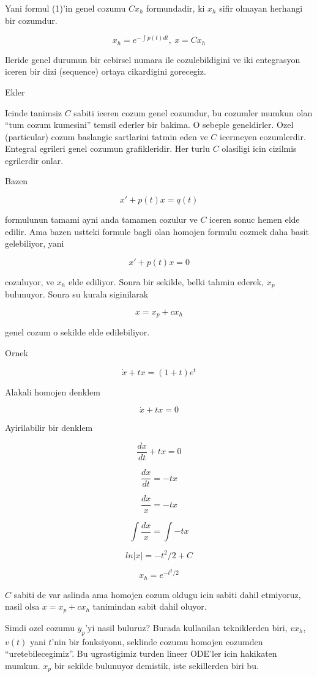 \documentclass[12pt,fleqn]{article}\usepackage{../common}
\begin{document}
Yani formul (1)'in genel cozumu $C x_h$ formundadir, ki $x_h$ sifir
olmayan herhangi bir cozumdur.

\[ x_h = e^{- \int p(t) dt} , \ x = C x_h \]

Ileride genel durumun bir cebirsel numara ile cozulebildigini ve iki
entegrasyon iceren bir dizi (sequence) ortaya cikardigini gorecegiz. 

Ekler

Icinde tanimsiz $C$ sabiti iceren cozum genel cozumdur, bu cozumler mumkun
olan ``tum cozum kumesini'' temsil ederler bir bakima. O sebeple
geneldirler. Ozel (particular) cozum baslangic sartlarini tatmin eden ve
$C$ icermeyen cozumlerdir. Entegral egrileri genel cozumun
grafikleridir. Her turlu $C$ olasiligi icin cizilmis egrilerdir onlar.

Bazen 

\[ x' + p(t)x = q(t) \]
 
formulunun tamami ayni anda tamamen cozulur ve $C$ iceren sonuc hemen elde
edilir. Ama bazen ustteki formule bagli olan homojen formulu cozmek daha
basit gelebiliyor, yani

\[ x' + p(t)x = 0 \]
 
cozuluyor, ve $x_h$ elde ediliyor. Sonra bir sekilde, belki tahmin ederek,
$x_p$ bulunuyor. Sonra su kurala siginilarak 

\[ x = x_p + cx_h \]

genel cozum o sekilde elde edilebiliyor. 

Ornek

\[ \dot{x} + tx = (1+t)e^t \]

Alakali homojen denklem 

\[ \dot{x} + tx = 0\]

Ayirilabilir bir denklem

\[ \frac{dx}{dt} + tx = 0 \]

\[ \frac{dx}{dt} = - tx  \]

\[ \frac{dx}{x} = -tx \]

\[ \int \frac{dx}{x} = \int -tx \]

\[ ln |x| = -t^2 / 2 + C \]

\[ x_h = e^{-t^2/2} \]

$C$ sabiti de var aslinda ama homojen cozum oldugu icin sabiti dahil
etmiyoruz, nasil olsa $x = x_p + cx_h$ tanimindan sabit dahil oluyor.

Simdi ozel cozumu $y_p$'yi nasil buluruz? Burada kullanilan tekniklerden
biri, $vx_h$, $v(t)$ yani $t$'nin bir fonksiyonu, seklinde cozumu homojen
cozumden ``uretebilecegimiz''. Bu ugrastigimiz turden lineer ODE'ler icin
hakikaten mumkun. $x_p$ bir sekilde bulunuyor demistik, iste sekillerden
biri bu. 
\end{document}
